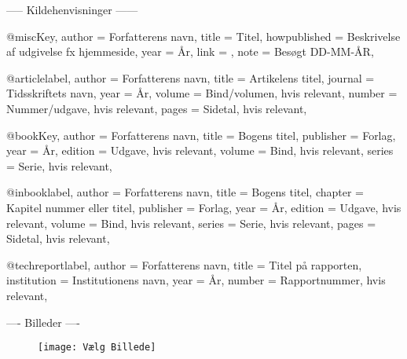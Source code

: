 ----- Kildehenvisninger ------

@misc{Key,
  author       = {Forfatterens navn},
  title        = {Titel},
  howpublished = {Beskrivelse af udgivelse fx hjemmeside},
  year         = {År},
  link         = {},
  note         = {Besøgt DD-MM-ÅR},
}


@article{label,
  author  = {Forfatterens navn},
  title   = {Artikelens titel},
  journal = {Tidsskriftets navn},
  year    = {År},
  volume  = {Bind/volumen, hvis relevant},
  number  = {Nummer/udgave, hvis relevant},
  pages   = {Sidetal, hvis relevant},
}

@book{Key,
  author    = {Forfatterens navn},
  title     = {Bogens titel},
  publisher = {Forlag},
  year      = {År},
  edition   = {Udgave, hvis relevant},
  volume    = {Bind, hvis relevant},
  series    = {Serie, hvis relevant},
}

@inbook{label,
  author       = {Forfatterens navn},
  title        = {Bogens titel},
  chapter      = {Kapitel nummer eller titel},
  publisher    = {Forlag},
  year         = {År},
  edition      = {Udgave, hvis relevant},
  volume       = {Bind, hvis relevant},
  series       = {Serie, hvis relevant},
  pages        = {Sidetal, hvis relevant},
}


@techreport{label,
  author      = {Forfatterens navn},
  title       = {Titel på rapporten},
  institution = {Institutionens navn},
  year        = {År},
  number      = {Rapportnummer, hvis relevant},
}

---- Billeder ----

\begin{figure}[H] %
    \centering
    \texttt{[image: Vælg Billede]}
    \captionsetup{font=footnotesize}
    \caption{}
    \label{fig: Navngiv figur til brug af henvisning}
\end{figure}

